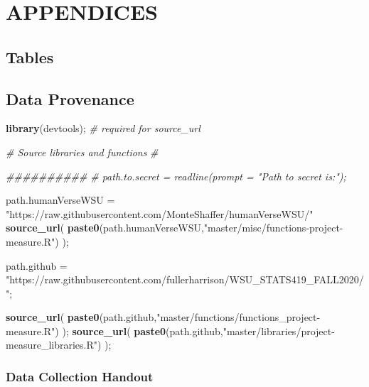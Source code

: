 \documentclass[]{article}
\newenvironment{Shaded}{\begin{snugshade}}{\end{snugshade}}
\newcommand{\CommentTok}[1]{\textcolor[rgb]{0.56,0.35,0.01}{\textit{#1}}}
\newcommand{\KeywordTok}[1]{\textcolor[rgb]{0.13,0.29,0.53}{\textbf{#1}}}
\newcommand{\NormalTok}[1]{#1}
\newcommand{\StringTok}[1]{\textcolor[rgb]{0.31,0.60,0.02}{#1}}
\begin{document}
\section{APPENDICES}
\label{sec:appendix}

\subsection{Tables}
\label{sec:appendix-table}





\newpage
\subsection{Data Provenance}
\label{sec:appendix-data-provenance}

\begin{Shaded}
\begin{Highlighting}[]
\KeywordTok{library}\NormalTok{(devtools);       }\CommentTok{# required for source_url}

\CommentTok{# Source libraries and functions}
\CommentTok{# }

\CommentTok{##########}
\CommentTok{# path.to.secret = readline(prompt = "Path to secret is:");}


\NormalTok{path.humanVerseWSU =}\StringTok{ "https://raw.githubusercontent.com/MonteShaffer/humanVerseWSU/"}
\KeywordTok{source_url}\NormalTok{( }\KeywordTok{paste0}\NormalTok{(path.humanVerseWSU,}\StringTok{"master/misc/functions-project-measure.R"}\NormalTok{) );}


\NormalTok{path.github =}\StringTok{ "https://raw.githubusercontent.com/fullerharrison/WSU_STATS419_FALL2020/"}\NormalTok{;}


\KeywordTok{source_url}\NormalTok{( }\KeywordTok{paste0}\NormalTok{(path.github,}\StringTok{"master/functions/functions_project-measure.R"}\NormalTok{) );}
\KeywordTok{source_url}\NormalTok{( }\KeywordTok{paste0}\NormalTok{(path.github,}\StringTok{"master/libraries/project-measure_libraries.R"}\NormalTok{) );}
\end{Highlighting}
\end{Shaded}

\newpage

\subsubsection{Data Collection Handout}
\label{sec:appendix-data-handout}
\end{document}
